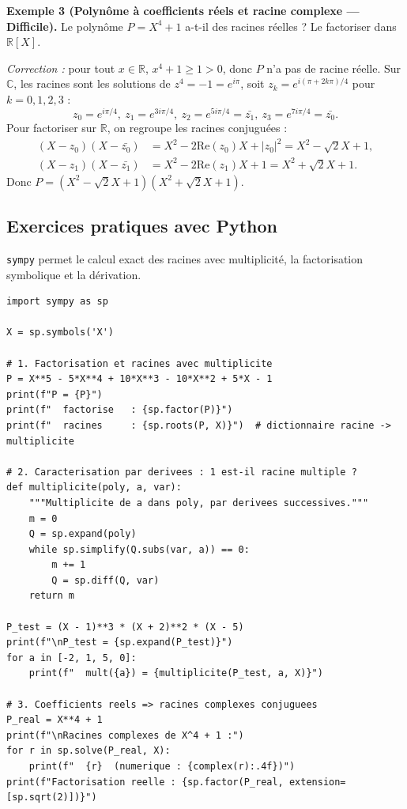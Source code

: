 \medskip

\textbf{Exemple 3 (Polynôme à coefficients réels et racine complexe --- Difficile).}
Le polynôme $P = X^4 + 1$ a-t-il des racines réelles ? Le factoriser dans $\mathbb{R}[X]$.

\textit{Correction :} pour tout $x \in \mathbb{R}$, $x^4 + 1 \ge 1 > 0$, donc $P$ n'a pas de racine réelle.
Sur $\mathbb{C}$, les racines sont les solutions de $z^4 = -1 = e^{i\pi}$, soit $z_k = e^{i(\pi + 2k\pi)/4}$ pour $k = 0, 1, 2, 3$ :
\[ z_0 = e^{i\pi/4},\ z_1 = e^{3i\pi/4},\ z_2 = e^{5i\pi/4} = \bar{z_1},\ z_3 = e^{7i\pi/4} = \bar{z_0}. \]
Pour factoriser sur $\mathbb{R}$, on regroupe les racines conjuguées :
\begin{align*}
(X - z_0)(X - \bar{z_0}) &= X^2 - 2 \mathrm{Re}(z_0) X + |z_0|^2 = X^2 - \sqrt{2} X + 1, \\
(X - z_1)(X - \bar{z_1}) &= X^2 - 2 \mathrm{Re}(z_1) X + 1 = X^2 + \sqrt{2} X + 1.
\end{align*}
Donc $P = (X^2 - \sqrt{2} X + 1)(X^2 + \sqrt{2} X + 1)$.

\subsection{Exercices pratiques avec Python}
\texttt{sympy} permet le calcul exact des racines avec multiplicité, la factorisation symbolique et la dérivation.

\begin{lstlisting}
import sympy as sp

X = sp.symbols('X')

# 1. Factorisation et racines avec multiplicite
P = X**5 - 5*X**4 + 10*X**3 - 10*X**2 + 5*X - 1
print(f"P = {P}")
print(f"  factorise   : {sp.factor(P)}")
print(f"  racines     : {sp.roots(P, X)}")  # dictionnaire racine -> multiplicite

# 2. Caracterisation par derivees : 1 est-il racine multiple ?
def multiplicite(poly, a, var):
    """Multiplicite de a dans poly, par derivees successives."""
    m = 0
    Q = sp.expand(poly)
    while sp.simplify(Q.subs(var, a)) == 0:
        m += 1
        Q = sp.diff(Q, var)
    return m

P_test = (X - 1)**3 * (X + 2)**2 * (X - 5)
print(f"\nP_test = {sp.expand(P_test)}")
for a in [-2, 1, 5, 0]:
    print(f"  mult({a}) = {multiplicite(P_test, a, X)}")

# 3. Coefficients reels => racines complexes conjuguees
P_real = X**4 + 1
print(f"\nRacines complexes de X^4 + 1 :")
for r in sp.solve(P_real, X):
    print(f"  {r}  (numerique : {complex(r):.4f})")
print(f"Factorisation reelle : {sp.factor(P_real, extension=[sp.sqrt(2)])}")
\end{lstlisting}

